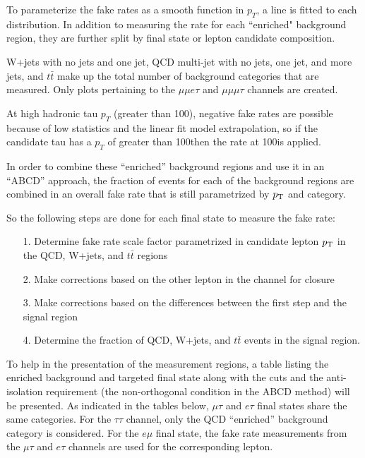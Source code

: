 To parameterize the fake rates as a smooth function in $p_T$, a line is fitted to each distribution. 
In addition to measuring the rate for each ``enriched" background region, they are further split by final state or lepton candidate composition. 

W+jets with no jets and one jet, QCD multi-jet with no jets, one jet, and more jets, and $t\bar{t}$ make up the total number of background categories that are measured. Only plots pertaining to the $\mu\mu e \tau$ and $\mu\mu \mu \tau$ channels are created. 


At high hadronic tau $p_T$ (greater than 100\GeV), negative fake rates are possible because of low statistics and the linear fit model extrapolation, so if the candidate tau has a $p_T$ of greater than 100\GeV then the rate at 100\GeV is applied. 


In order to combine these ``enriched'' background regions and use it in an ``ABCD'' approach, the fraction of events for each of the background regions are combined in an overall fake rate that is still parametrized by $p_{\mathrm{T}}$ and category.  

So the following steps are done for each final state to measure the fake rate:
\begin{enumerate}
\item[1.] Determine fake rate scale factor parametrized in candidate lepton $p_{\mathrm{T}}$ in the QCD, W+jets, and $t\bar{t}$ regions
\item[2.] Make corrections based on the other lepton in the channel for closure 
\item[3.] Make corrections based on the differences between the first step and the signal region
\item[4.] Determine the fraction of QCD, W+jets, and $t\bar{t}$ events in the signal region.
\end{enumerate} 

To help in the presentation of the measurement regions, a table listing the enriched background and targeted final state along with the cuts and the anti-isolation requirement (the non-orthogonal condition in the ABCD method) will be presented. 
As indicated in the tables below, $\mu\tau$ and $e \tau$ final states share the same categories. For the $\tau\tau$ channel, only the QCD ``enriched'' background category is considered. 
For the $e\mu$ final state, the fake rate measurements from the $\mu\tau$ and $e \tau$ channels are used for the corresponding lepton. 

